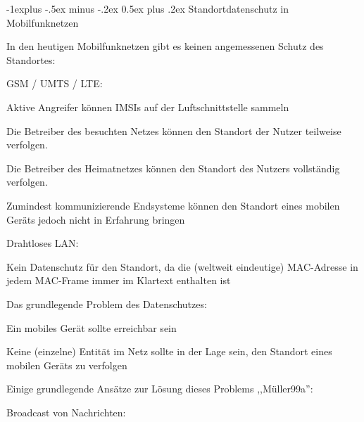 \documentclass[a4paper]{article}
\makeatletter
\renewcommand{\subsection}{\@startsection{subsection}{2}{0mm}%
 {-1explus -.5ex minus -.2ex}%
 {0.5ex plus .2ex}%
 {\normalfont\normalsize\bfseries}}
\makeatother
\begin{document}
\begin{multicols}{3}
\begin{itemize*}
            \subsection{Standortdatenschutz in
                  Mobilfunknetzen}
            \begin{itemize*}
                  \item In den heutigen Mobilfunknetzen gibt es keinen angemessenen Schutz des
                  Standortes:
                  \begin{itemize*}
                        \item GSM / UMTS / LTE:
                        \begin{itemize*} \item Aktive Angreifer können IMSIs auf der Luftschnittstelle sammeln \item Die Betreiber des besuchten Netzes können den Standort der Nutzer teilweise verfolgen. \item Die Betreiber des Heimatnetzes können den Standort des Nutzers vollständig verfolgen. \item Zumindest kommunizierende Endsysteme können den Standort eines mobilen Geräts jedoch nicht in Erfahrung bringen \end{itemize*}
                  \end{itemize*}
                  \item Drahtloses LAN:
                  \begin{itemize*}
                        \item Kein Datenschutz für den Standort, da die (weltweit eindeutige) MAC-Adresse in jedem MAC-Frame immer im Klartext enthalten ist
                  \end{itemize*}
                  \item Das grundlegende Problem des Datenschutzes:
                  \begin{itemize*}
                        \item Ein mobiles Gerät sollte erreichbar sein
                        \item Keine (einzelne) Entität im Netz sollte in der Lage sein, den Standort eines mobilen Geräts zu verfolgen
                  \end{itemize*}
                  \item Einige grundlegende Ansätze zur Lösung dieses Problems
                  ,,Müller99a'':
                  \begin{itemize*}
                        \item Broadcast von Nachrichten:

\end{itemize*}
\end{itemize*}
\end{itemize*}
\end{multicols}
\end{document}
